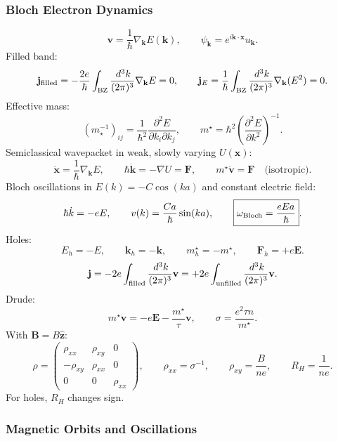 \subsubsection*{Bloch Electron Dynamics}

\[
\boxed{\mathbf v=\frac1\hbar\nabla_{\mathbf k}E(\mathbf k)},\qquad
\psi_{\mathbf k}=e^{i\mathbf k\cdot\mathbf x}u_{\mathbf k}.
\]
Filled band:
\[
\mathbf j_{\rm filled}
=-\frac{2e}{\hbar}\int_{\rm BZ}\frac{\,d^3k}{(2\pi)^3}\nabla_{\mathbf k}E=0,
\qquad
\mathbf j_E=\frac1\hbar\int_{\rm BZ}\frac{\,d^3k}{(2\pi)^3}\nabla_{\mathbf k}(E^2)=0.
\]
Effective mass:
\[
\boxed{(m_\star^{-1})_{ij}
=\frac1{\hbar^2}\frac{\partial^2E}{\partial k_i\partial k_j}},\qquad
m^\star=\hbar^2\left(\frac{\partial^2E}{\partial k^2}\right)^{-1}.
\]
Semiclassical wavepacket in weak, slowly varying $U(\mathbf x)$:
\[
\dot{\mathbf x}=\frac1\hbar\nabla_{\mathbf k}E,\qquad
\boxed{\hbar\dot{\mathbf k}=-\nabla U=\mathbf F},\qquad
m^\star\dot{\mathbf v}=\mathbf F\quad\text{(isotropic)}.
\]
Bloch oscillations in $E(k)=-C\cos(ka)$ and constant electric field:
\[
\hbar\dot k=-eE,\qquad
v(k)=\frac{Ca}{\hbar}\sin(ka),\qquad
\boxed{\omega_{\rm Bloch}=\frac{eEa}{\hbar}}.
\]
Holes:
\[
E_h=-E,\qquad \mathbf k_h=-\mathbf k,\qquad m_h^\star=-m^\star,\qquad
\mathbf F_h=+e\mathbf E.
\]
\[
\mathbf j=-2e\int_{\rm filled}\frac{\,d^3k}{(2\pi)^3}\mathbf v
=+2e\int_{\rm unfilled}\frac{\,d^3k}{(2\pi)^3}\mathbf v.
\]
Drude:
\[
m^\star\dot{\mathbf v}=-e\mathbf E-\frac{m^\star}{\tau}\mathbf v,\qquad
\boxed{\sigma=\frac{e^2\tau n}{m^\star}}.
\]
With $\mathbf B=B\hat{\mathbf z}$:
\[
\rho=\begin{pmatrix}\rho_{xx}&\rho_{xy}&0\\-\rho_{xy}&\rho_{xx}&0\\0&0&\rho_{xx}\end{pmatrix},
\qquad
\rho_{xx}=\sigma^{-1},\qquad
\boxed{\rho_{xy}=\frac{B}{ne}},\qquad R_H=\frac1{ne}.
\]
For holes, $R_H$ changes sign. 

\subsubsection*{Magnetic Orbits and Oscillations}

